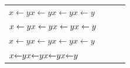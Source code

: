 \documentclass{unittest}
\begin{document}
\begin{tabular}{llll}\toprule
\(
\mathord{x}\mathrel{\leftarrow}\mathord{y}
\mathord{x}\mathrel{\leftarrow}\mathord{y}
\mathord{x}\mathrel{\leftarrow}\mathord{y}
\mathord{x}\mathrel{\leftarrow}\mathord{y}
\)
\\
\(
\begingroup\mathord{x}\endgroup\begingroup\mathrel{\leftarrow}\endgroup\begingroup\mathord{y}\endgroup
\begingroup\mathord{x}\endgroup\begingroup\mathrel{\leftarrow}\endgroup\begingroup\mathord{y}\endgroup
\begingroup\mathord{x}\endgroup\begingroup\mathrel{\leftarrow}\endgroup\begingroup\mathord{y}\endgroup
\begingroup\mathord{x}\endgroup\begingroup\mathrel{\leftarrow}\endgroup\begingroup\mathord{y}\endgroup
\)
\\
\(
{\mathord{x}}{\mathrel{\leftarrow}}{\mathord{y}}
{\mathord{x}}{\mathrel{\leftarrow}}{\mathord{y}}
{\mathord{x}}{\mathrel{\leftarrow}}{\mathord{y}}
{\mathord{x}}{\mathrel{\leftarrow}}{\mathord{y}}
\)
\\
\(
\bgroup\mathord{x}\egroup\bgroup\mathrel{\leftarrow}\egroup\bgroup\mathord{y}\egroup
\bgroup\mathord{x}\egroup\bgroup\mathrel{\leftarrow}\egroup\bgroup\mathord{y}\egroup
\bgroup\mathord{x}\egroup\bgroup\mathrel{\leftarrow}\egroup\bgroup\mathord{y}\egroup
\bgroup\mathord{x}\egroup\bgroup\mathrel{\leftarrow}\egroup\bgroup\mathord{y}\egroup
\)
\end{tabular}
\end{document}
